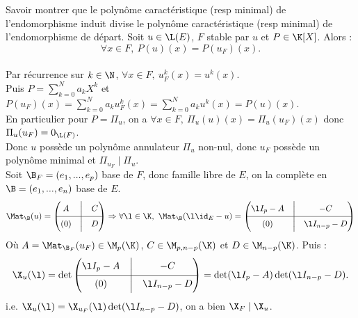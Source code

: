 \documentclass[french, 11pt]{article}
\begin{document}
\begin{exercice}{}{}
    Savoir montrer que le polynôme caractéristique (resp minimal) de l'endomorphisme induit divise le polynôme caractéristique (resp minimal) de l'endomorphisme de départ.
    \tcblower
    Soit $u\in\L(E)$, $F$ stable par $u$ et $P\in\K[X]$. Alors :
    \begin{equation*}
        \forall x \in F, ~ P(u)(x) = P(u_F)(x).
    \end{equation*}
    \\
    Par récurrence sur $k\in\N$, $\forall x \in F, ~ u_F^k(x)=u^k(x)$.\\
    Puis $P=\sum_{k=0}^N a_kX^k$ et $P(u_F)(x)=\sum_{k=0}^N a_k u_F^k(x)=\sum_{k=0}^N a_ku^k(x)=P(u)(x)$.\\
    En particulier pour $P = \Pi_u$, on a $\forall x \in F, ~ \Pi_u(u)(x)=\Pi_u(u_F)(x)$ donc $\Pi_u(u_F)=0_{\L(F)}$.\\
    Donc $u$ possède un polynôme annulateur $\Pi_u$ non-nul, donc $u_F$ possède un polynôme minimal et $\Pi_{u_F}\mid \Pi_u$.\\
     Soit $\B_F=(e_1,...,e_p)$ base de $F$, donc famille libre de $E$, on la complète en $\B=(e_1,...,e_n)$ base de $E$.
    \begin{equation*}
        \Mat_\B(u) = \begin{pmatrix} A & \Big| & C \\ \hline (0) & \Big| & D \end{pmatrix} \Rightarrow \forall \l \in \K, ~ \Mat_\B(\l\id_E-u) = \begin{pmatrix} \l I_p - A & \Big| & -C \\ \hline (0) & \Big| & \l I_{n-p} - D \end{pmatrix}
    \end{equation*}
    Où $A=\Mat_{\B_F}(u_F)\in \M_p(\K)$, $C\in \M_{p,n-p}(\K)$ et $D\in \M_{n-p}(\K)$. Puis :
    \begin{equation*}
        \X_u(\l) = \det\begin{pmatrix}\l I_p - A & \Big| & -C \\ \hline (0) & \Big| & \l I_{n-p} - D \end{pmatrix} = \det(\l I_p - A)\det(\l I_{n-p}-D).
    \end{equation*}
    i.e. $\X_u(\l) = \X_{u_F}(\l)\det(\l I_{n-p}-D)$, on a bien $\X_F \mid \X_u$.
\end{exercice}
\end{document}
